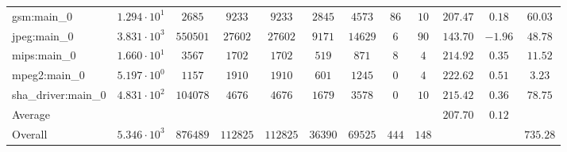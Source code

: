 \begin{tabular}{|l|c|c|c|c|c|c|c|c|c|c|c|}
gsm:main\_0             & $ 1.294 \cdot 10^{1}  $ & $ 2685   $ & $ 9233   $ & $ 9233   $ & $ 2845  $ & $ 4573  $ & $ 86  $ & $ 10  $ & $ 207.47      $ & $ 0.18    $ & $ 60.03   $ \\
jpeg:main\_0            & $ 3.831 \cdot 10^{3}  $ & $ 550501 $ & $ 27602  $ & $ 27602  $ & $ 9171  $ & $ 14629 $ & $ 6   $ & $ 90  $ & $ 143.70      $ & $ -1.96   $ & $ 48.78   $ \\
mips:main\_0            & $ 1.660 \cdot 10^{1}  $ & $ 3567   $ & $ 1702   $ & $ 1702   $ & $ 519   $ & $ 871   $ & $ 8   $ & $ 4   $ & $ 214.92      $ & $ 0.35    $ & $ 11.52   $ \\
mpeg2:main\_0           & $ 5.197 \cdot 10^{0}  $ & $ 1157   $ & $ 1910   $ & $ 1910   $ & $ 601   $ & $ 1245  $ & $ 0   $ & $ 4   $ & $ 222.62      $ & $ 0.51    $ & $ 3.23    $ \\
sha\_driver:main\_0     & $ 4.831 \cdot 10^{2}  $ & $ 104078 $ & $ 4676   $ & $ 4676   $ & $ 1679  $ & $ 3578  $ & $ 0   $ & $ 10  $ & $ 215.42      $ & $ 0.36    $ & $ 78.75   $ \\
\hline
Average                 & $                     $ & $        $ & $        $ & $        $ & $       $ & $       $ & $     $ & $     $ & $ 207.70      $ & $ 0.12    $ & $         $ \\
\hline
Overall                 & $ 5.346 \cdot 10^{3}  $ & $ 876489 $ & $ 112825 $ & $ 112825 $ & $ 36390 $ & $ 69525 $ & $ 444 $ & $ 148 $ & $             $ & $         $ & $ 735.28  $ \\
\hline
\end{tabular}
